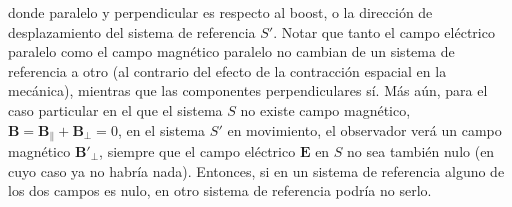 donde paralelo y perpendicular es respecto al boost, o la dirección de desplazamiento del sistema de referencia $S'$. Notar que tanto el campo eléctrico paralelo como el campo magnético paralelo no cambian de un sistema de referencia a otro (al contrario del efecto de la contracción espacial en la mecánica), mientras que las componentes perpendiculares sí. Más aún, para el caso particular en el que el sistema $S$ no existe campo magnético, $\textbf{B} = \textbf{B}_{\parallel} + \textbf{B}_{\perp} = 0$, en el sistema $S'$ en movimiento, el observador verá un campo magnético $\textbf{B}'_{\perp}$, siempre que el campo eléctrico $\textbf{E}$ en $S$ no sea también nulo (en cuyo caso ya no habría nada). Entonces, si en un sistema de referencia alguno de los dos campos es nulo, en otro sistema de referencia podría no serlo.




